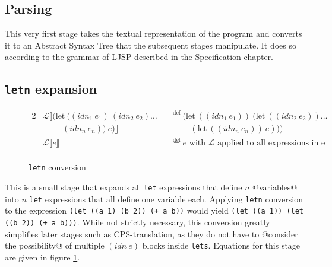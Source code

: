\documentclass[11pt]{report}
\newcommand{\eqdef}{\stackrel{\text{def}}{=}}%
\begin{document}
\subsection{Parsing}
This very first stage takes the textual representation of the program and converts it to an Abstract Syntax Tree that the subsequent stages manipulate. It does so according to the grammar of LJSP described in the Specification chapter.

\subsection{\texttt{letn} expansion}
\begin{figure}[ht]
\begin{alignat*}{2}
&\mathcal{L}\llbracket (\text{let}\ ((idn_1\ e_1)\ (idn_2\ e_2)\dots &&\eqdef (\text{let}\ ((idn_1\ e_1))\ (\text{let}\ ((idn_2\ e_2)) \dots \\
&\hspace{1cm} (idn_n\ e_n))\ e)\rrbracket &&\hspace{1cm}(\text{let}\ ((idn_n\ e_n))\ e)))\\
&\mathcal{L}\llbracket e \rrbracket && \eqdef e\text{ with $\mathcal{L}$ applied to all expressions in e}\\
\end{alignat*}
\caption{\texttt{letn} conversion}
\label{letnconversion}
\end{figure}
This is a small stage that expands all \texttt{let} expressions that define $n$ @variables@ into $n$ \texttt{let} expressions that all define one variable each. Applying \texttt{letn} conversion to the expression \texttt{(let ((a 1) (b 2)) (+ a b))} would yield \texttt{(let ((a 1)) (let ((b 2)) (+ a b)))}. While not strictly necessary, this conversion greatly simplifies later stages such as CPS-translation, as they do not have to @consider the possibility@ of multiple $(idn\ e)$ blocks inside \texttt{lets}. Equations for this stage are given in figure \ref{letnconversion}.
\end{document}
